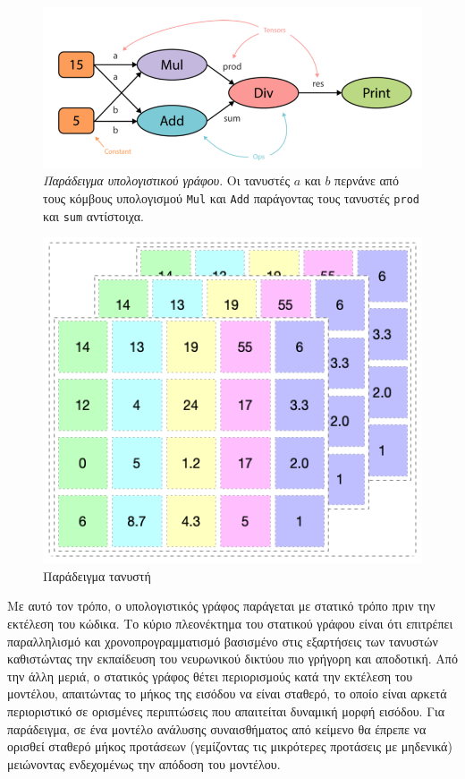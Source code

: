 \begin{figure}[H]
	\centering
	\includegraphics[scale=0.4]{images/chapter3/computation_graph.png}
	\caption[Παράδειγμα υπολογιστικού γράφου]{\textsl{Παράδειγμα υπολογιστικού γράφου}. Οι τανυστές $a$ και $b$ περνάνε από τους κόμβους υπολογισμού \texttt{Mul} και \texttt{Add} παράγοντας τους τανυστές \texttt{prod} και \texttt{sum} αντίστοιχα.}
	\label{fig:computational_graph}
\end{figure}

\begin{figure}[h]
	\centering
	\includegraphics[scale=0.7]{images/chapter3/tensor_example.png}
	\caption{Παράδειγμα τανυστή}
	\label{fig:tensor_example}
\end{figure}

Με αυτό τον τρόπο, ο υπολογιστικός γράφος παράγεται με στατικό τρόπο πριν την εκτέλεση του κώδικα. Το κύριο πλεονέκτημα του στατικού γράφου είναι ότι επιτρέπει παραλληλισμό και χρονοπρογραμματισμό βασισμένο στις εξαρτήσεις των τανυστών καθιστώντας την εκπαίδευση του νευρωνικού δικτύου πιο γρήγορη και αποδοτική. Από την άλλη μεριά, ο στατικός γράφος θέτει περιορισμούς κατά την εκτέλεση του μοντέλου, απαιτώντας το μήκος της εισόδου να είναι σταθερό, το οποίο είναι αρκετά περιοριστικό σε ορισμένες περιπτώσεις που απαιτείται δυναμική μορφή εισόδου. Για παράδειγμα, σε ένα μοντέλο ανάλυσης συναισθήματος από κείμενο θα έπρεπε να ορισθεί σταθερό μήκος προτάσεων (γεμίζοντας τις μικρότερες προτάσεις με μηδενικά) μειώνοντας ενδεχομένως την απόδοση του μοντέλου.


